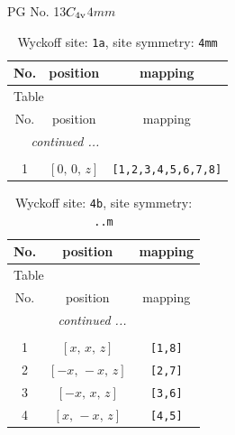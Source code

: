 \documentclass[fleqn,8pt]{jsarticle}
\begin{document}
\setcounter{MaxMatrixCols}{32}

\renewcommand{\tablename}{Table~}
\renewcommand{\figurename}{Figure~}
\begin{center}
\LARGE
PG No. 13\quad$C_{\rm 4v}$\quad$4mm$\quad[ tetragonal ]
\end{center}
\renewcommand{\arraystretch}{1.2}
\begin{longtable}{ccc}
\caption{Wyckoff site: {\tt 1a}, site symmetry: {\tt 4mm}}
 \\
 \hline \hline
No. & position & mapping \\ \hline \endfirsthead

\multicolumn{2}{l}{\tablename\ \thetable{}} \\
 \hline \hline
No. & position & mapping \\ \hline \endhead

 \hline \hline
\multicolumn{2}{r}{\footnotesize\it continued ...} \\ \endfoot

 \hline \hline
\multicolumn{2}{r}{} \\ \endlastfoot

1 & $\left[ 0,\, 0,\, z \right]$ & {\tt [1,2,3,4,5,6,7,8]} \\
\end{longtable}
\renewcommand{\arraystretch}{1.2}
\begin{longtable}{ccc}
\caption{Wyckoff site: {\tt 4b}, site symmetry: {\tt ..m}}
 \\
 \hline \hline
No. & position & mapping \\ \hline \endfirsthead

\multicolumn{2}{l}{\tablename\ \thetable{}} \\
 \hline \hline
No. & position & mapping \\ \hline \endhead

 \hline \hline
\multicolumn{2}{r}{\footnotesize\it continued ...} \\ \endfoot

 \hline \hline
\multicolumn{2}{r}{} \\ \endlastfoot

1 & $\left[ x,\, x,\, z \right]$ & {\tt [1,8]} \\ \hline
2 & $\left[ - x,\, - x,\, z \right]$ & {\tt [2,7]} \\ \hline
3 & $\left[ - x,\, x,\, z \right]$ & {\tt [3,6]} \\ \hline
4 & $\left[ x,\, - x,\, z \right]$ & {\tt [4,5]} \\
\end{longtable}
\end{document}
